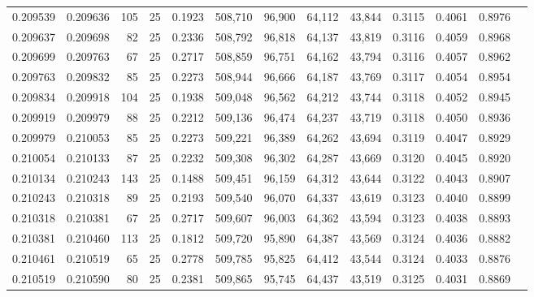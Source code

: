 \begin{tabular}{rrrrrrrrrrrrr}
0.209539 & 0.209636 &   105 &  25 &                                     0.1923 & 508,710 &  96,900 &  64,112 &  43,844 & 0.3115 & 0.4061 & 0.8976 \\
0.209637 & 0.209698 &    82 &  25 &                                     0.2336 & 508,792 &  96,818 &  64,137 &  43,819 & 0.3116 & 0.4059 & 0.8968 \\
0.209699 & 0.209763 &    67 &  25 &                                     0.2717 & 508,859 &  96,751 &  64,162 &  43,794 & 0.3116 & 0.4057 & 0.8962 \\
0.209763 & 0.209832 &    85 &  25 &                                     0.2273 & 508,944 &  96,666 &  64,187 &  43,769 & 0.3117 & 0.4054 & 0.8954 \\
0.209834 & 0.209918 &   104 &  25 &                                     0.1938 & 509,048 &  96,562 &  64,212 &  43,744 & 0.3118 & 0.4052 & 0.8945 \\
0.209919 & 0.209979 &    88 &  25 &                                     0.2212 & 509,136 &  96,474 &  64,237 &  43,719 & 0.3118 & 0.4050 & 0.8936 \\
0.209979 & 0.210053 &    85 &  25 &                                     0.2273 & 509,221 &  96,389 &  64,262 &  43,694 & 0.3119 & 0.4047 & 0.8929 \\
0.210054 & 0.210133 &    87 &  25 &                                     0.2232 & 509,308 &  96,302 &  64,287 &  43,669 & 0.3120 & 0.4045 & 0.8920 \\
0.210134 & 0.210243 &   143 &  25 &                                     0.1488 & 509,451 &  96,159 &  64,312 &  43,644 & 0.3122 & 0.4043 & 0.8907 \\
0.210243 & 0.210318 &    89 &  25 &                                     0.2193 & 509,540 &  96,070 &  64,337 &  43,619 & 0.3123 & 0.4040 & 0.8899 \\
0.210318 & 0.210381 &    67 &  25 &                                     0.2717 & 509,607 &  96,003 &  64,362 &  43,594 & 0.3123 & 0.4038 & 0.8893 \\
0.210381 & 0.210460 &   113 &  25 &                                     0.1812 & 509,720 &  95,890 &  64,387 &  43,569 & 0.3124 & 0.4036 & 0.8882 \\
0.210461 & 0.210519 &    65 &  25 &                                     0.2778 & 509,785 &  95,825 &  64,412 &  43,544 & 0.3124 & 0.4033 & 0.8876 \\
0.210519 & 0.210590 &    80 &  25 &                                     0.2381 & 509,865 &  95,745 &  64,437 &  43,519 & 0.3125 & 0.4031 & 0.8869 \\

\end{tabular}
